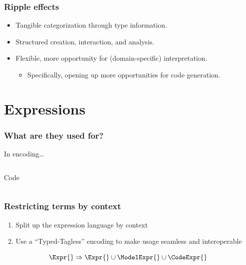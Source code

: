\documentclass[xcolor={dvipsnames}]{beamer}
\begin{document}
\begin{frame}
  \frametitle{Ripple effects}

  \begin{itemize}
    \item Tangible categorization through type information.
    \item Structured creation, interaction, and analysis.
    \item Flexible, more opportunity for (domain-specific) interpretation.
      \begin{itemize}
        \item Specifically, opening up more opportunities for code generation.
      \end{itemize}
  \end{itemize}

\end{frame}

\section{Expressions}

\begin{frame}
  \frametitle{What are they used for?}

  In encoding\ldots{}
  \begin{columns}
    \begin{column}{0.3\textwidth}
      \begin{center}
        Code
      \end{center}
      \missingfigure{}
    \end{column}
    \hfill
    \begin{column}{0.3\textwidth}
      \missingfigure{}
    \end{column}
    \hfill
    \begin{column}{0.3\textwidth}
      \missingfigure{}
    \end{column}
  \end{columns}
\end{frame}

\begin{frame}
  \frametitle{Restricting terms by context}

  \begin{enumerate}
    \item Split up the expression language by context
    \item Use a ``Typed-Tagless'' encoding to make usage seamless and
          interoperable
  \end{enumerate}

  \[\Expr{} \Rightarrow{} \Expr{} \cup{} \ModelExpr{} \cup{} \CodeExpr{}\]

\end{frame}
\end{document}
